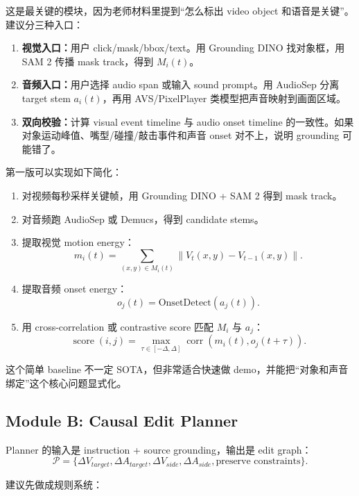 这是最关键的模块，因为老师材料里提到“怎么标出 video object 和语音是关键”。建议分三种入口：

\begin{enumerate}[leftmargin=2em]
  \item \textbf{视觉入口：}用户 click/mask/bbox/text。用 Grounding DINO 找对象框，用 SAM 2 传播 mask track，得到 $M_i(t)$。
  \item \textbf{音频入口：}用户选择 audio span 或输入 sound prompt。用 AudioSep 分离 target stem $a_i(t)$，再用 AVS/PixelPlayer 类模型把声音映射到画面区域。
  \item \textbf{双向校验：}计算 visual event timeline 与 audio onset timeline 的一致性。如果对象运动峰值、嘴型/碰撞/敲击事件和声音 onset 对不上，说明 grounding 可能错了。
\end{enumerate}

第一版可以实现如下简化：

\begin{enumerate}[leftmargin=2em]
  \item 对视频每秒采样关键帧，用 Grounding DINO + SAM 2 得到 mask track。
  \item 对音频跑 AudioSep 或 Demucs，得到 candidate stems。
  \item 提取视觉 motion energy：
  \[
  m_i(t)=\sum_{(x,y)\in M_i(t)} \|V_t(x,y)-V_{t-1}(x,y)\|.
  \]
  \item 提取音频 onset energy：
  \[
  o_j(t)=\text{OnsetDetect}(a_j(t)).
  \]
  \item 用 cross-correlation 或 contrastive score 匹配 $M_i$ 与 $a_j$：
  \[
  \operatorname{score}(i,j)=\max_{\tau \in [-\Delta,\Delta]} \operatorname{corr}(m_i(t), o_j(t+\tau)).
  \]
\end{enumerate}

这个简单 baseline 不一定 SOTA，但非常适合快速做 demo，并能把“对象和声音绑定”这个核心问题显式化。

\subsection{Module B: Causal Edit Planner}

Planner 的输入是 instruction + source grounding，输出是 edit graph：
\[
\mathcal{P}=\{\Delta V_{target}, \Delta A_{target}, \Delta V_{side}, \Delta A_{side}, \text{preserve constraints}\}.
\]

建议先做成规则系统：

